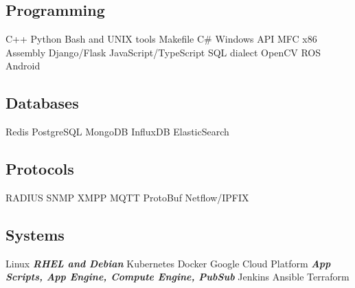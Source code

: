 \documentclass[letterpaper]{deedy-resume} %
\begin{document}
\begin{minipage}[t]{0.33\textwidth}
\sectionspace

\subsection{Programming}
C++ \textbullet{} Python \textbullet{} Bash and UNIX tools  
Makefile \textbullet{} C\# 
\textbullet{} Windows API \textbullet{} MFC  \textbullet{} x86 Assembly 
\textbullet{} Django/Flask \textbullet{} JavaScript/TypeScript \textbullet{} SQL dialect 
\textbullet{} OpenCV \textbullet{} ROS \textbullet{} Android 


\sectionspace

\subsection{Databases}
Redis \textbullet{} PostgreSQL \textbullet{} MongoDB
\textbullet{} InfluxDB \textbullet{} ElasticSearch 

\sectionspace

\subsection{Protocols}
RADIUS \textbullet{} SNMP \textbullet{} XMPP
\textbullet{} MQTT \textbullet{} ProtoBuf \textbullet{} Netflow/IPFIX

\sectionspace

\subsection{Systems}
Linux {\footnotesize \textit{\textbf{RHEL and Debian}}} \textbullet{} Kubernetes 
\textbullet{} Docker \textbullet{} Google Cloud Platform {\footnotesize \textit{\textbf{App Scripts, App Engine, Compute Engine, PubSub}}} 
\textbullet{} Jenkins \textbullet{} Ansible \textbullet{} Terraform 

%

\sectionspace %


\end{minipage} %
\end{document}
